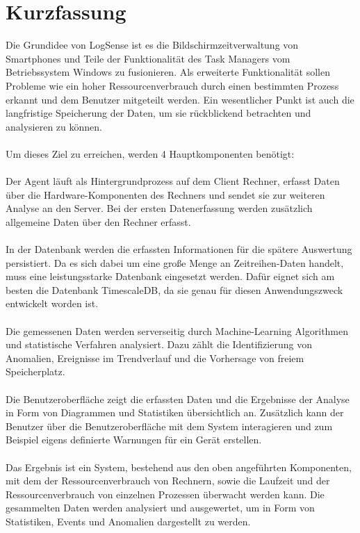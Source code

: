 \documentclass{report}
\begin{document}
\chapter*{Kurzfassung}
Die Grundidee von LogSense ist es die Bildschirmzeitverwaltung von Smartphones und Teile der Funktionalität des Task Managers vom Betriebssystem Windows zu fusionieren. Als erweiterte Funktionalität sollen Probleme wie ein hoher Ressourcenverbrauch durch einen bestimmten Prozess erkannt und dem Benutzer mitgeteilt werden. Ein wesentlicher Punkt ist auch die langfristige Speicherung der Daten, um sie rückblickend betrachten und analysieren zu können.\\\\

\noindent Um dieses Ziel zu erreichen, werden 4 Hauptkomponenten benötigt:\\\\
Der Agent läuft als Hintergrundprozess auf dem Client Rechner, erfasst Daten über die Hardware-Komponenten des Rechners und sendet sie zur weiteren Analyse an den Server. Bei der ersten Datenerfassung werden zusätzlich allgemeine Daten über den Rechner erfasst.\\\\
In der Datenbank werden die erfassten Informationen für die spätere Auswertung persistiert. Da es sich dabei um eine große Menge an Zeitreihen-Daten handelt, muss eine leistungsstarke Datenbank eingesetzt werden. Dafür eignet sich am besten die Datenbank TimescaleDB, da sie genau für diesen Anwendungszweck entwickelt worden ist.\\\\
Die gemessenen Daten werden serverseitig durch Machine-Learning Algorithmen und statistische Verfahren analysiert. Dazu zählt die Identifizierung von Anomalien, Ereignisse im Trendverlauf und die Vorhersage von freiem Speicherplatz.\\\\
Die Benutzeroberfläche zeigt die erfassten Daten und die Ergebnisse der Analyse in Form von Diagrammen und Statistiken übersichtlich an. Zusätzlich kann der Benutzer über die Benutzeroberfläche mit dem System interagieren und zum Beispiel eigens definierte Warnungen für ein Gerät erstellen.\\\\

\noindent Das Ergebnis ist ein System, bestehend aus den oben angeführten Komponenten, mit dem der Ressourcenverbrauch von Rechnern, sowie die Laufzeit und der Ressourcenverbrauch von einzelnen Prozessen überwacht werden kann. Die gesammelten Daten werden analysiert und ausgewertet, um in Form von Statistiken, Events und Anomalien dargestellt zu werden.
\end{document}
